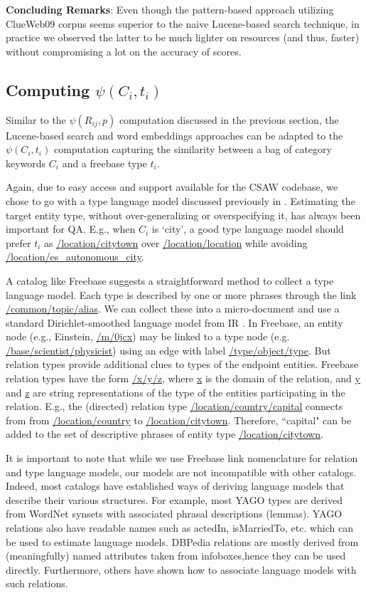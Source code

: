 \documentclass[a4paper, twoside, 12pt]{report}
\begin{document}
\textbf{Concluding Remarks}: Even though the pattern-based approach utilizing ClueWeb09 corpus seems superior to the naive Lucene-based search technique, in practice we observed the latter to be much lighter on resources (and thus, faster) without compromising a lot on the accuracy of scores.

\subsection{Computing $\psi(C_i, t_i)$}
Similar to the $\psi(R_{ij},p)$ computation discussed in the previous section, the Lucene-based search and word embeddings approaches can be adapted to the $\psi(C_i, t_i)$ computation capturing the similarity between a bag of category keywords $C_i$ and a freebase type $t_i$.

Again, due to easy access and support available for the CSAW codebase, we chose to go with a type language model discussed previously in \cite{joshiknowledge}.
Estimating the target entity type, without over-generalizing or overspecifying it, has always been important for QA. E.g., when $C_i$ is `city', a good type language model should prefer $t_i$ as \url{/location/citytown} over \url{/location/location} while avoiding \url{/location/es_autonomous_city}.

A catalog like Freebase suggests a straightforward method to collect a type language model. Each type is described by one or more phrases through the link \url{/common/topic/alias}. We
can collect these into a micro-document and use a standard Dirichlet-smoothed language model from IR \cite{zhai2008statistical}. In Freebase, an entity node (e.g., Einstein, \url{/m/0jcx}) may be linked to a type node (e.g. \url{/base/scientist/physicist}) using an edge with label \url{/type/object/type}. But relation types provide additional clues to types of the endpoint entities. Freebase relation types have the form \url{/x/y/z}, where \url{x} is the domain of the relation, and \url{y} and \url{z} are string representations of the type of the entities participating in the relation. E.g., the (directed) relation
type \url{/location/country/capital} connects from from \url{/location/country} to \url{/location/citytown}. Therefore, ``capital" can be added to the set of descriptive phrases of entity type \url{/location/citytown}.

It is important to note that while we use Freebase link nomenclature for relation and type language models, our models are not incompatible with other catalogs. Indeed, most catalogs have established ways of deriving language models that describe their various structures. For example, most YAGO types are derived from WordNet synsets with associated phrasal descriptions (lemmas). YAGO relations also have readable names such as actedIn, isMarriedTo, etc. which can be used to estimate language models. DBPedia relations are mostly derived from (meaningfully) named attributes taken from infoboxes,hence they can be used directly. Furthermore, others \cite{wu2007autonomously} have shown how to associate language models with such relations.
\end{document}
